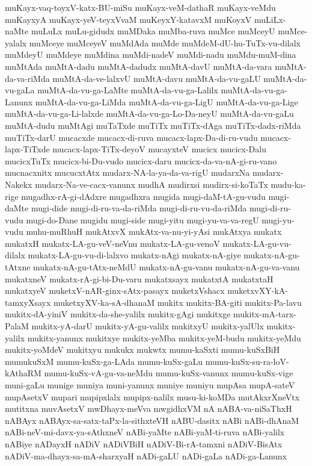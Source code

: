 {muKayx-vaq-toyxV-katx-BU-miSu
muKayx-veM-dathaR
muKayx-veMdu
muKayxyA
muKayx-yeV-teyxVvaM
muKeyxY-katavxM
muKoyxV
muLiLx-naMte
muLuLx
muLu-gidudx
muMDaka
muMba-ruva
muMce
muMceyU
muMce-yalalx
muMceye
muMceyeV
muMdAda
muMde
muMdeM-dU-hu-TuTx-vu-dilalx
muMdeyU
muMdeye
muMdina
muMdi-nadeV
muMdi-nadu
muMdu-muM-dina
muMtAda
muMtA-dadu
muMtA-dadudx
muMtA-davU
muMtA-da-vara
muMtA-da-va-riMda
muMtA-da-ve-lalxvU
muMtA-davu
muMtA-da-vu-gaLU
muMtA-da-vu-gaLa
muMtA-da-vu-ga-LaMte
muMtA-da-vu-ga-Lalilx
muMtA-da-vu-ga-Lanunx
muMtA-da-vu-ga-LiMda
muMtA-da-vu-ga-LigU
muMtA-da-vu-ga-Lige
muMtA-da-vu-ga-Li-lalxde
muMtA-da-vu-ga-Lo-Da-neyU
muMtA-da-vu-gaLu
muMtA-dudu
muMtAgi
muTaTxde
muTiTx
muTiTx-dAga
muTiTx-dadx-riMda
muTiTx-darU
mucacxde
mucacx-di-ruva
mucacx-lapx-Da-di-ru-vudu
mucacx-lapx-TiTxde
mucacx-lapx-TiTx-deyoV
mucayxteV
mucicx
mucicx-Dalu
mucicxTuTx
mucicx-bi-Du-vudo
mucicx-daru
mucicx-da-va-nA-gi-ru-vano
mucnacxnitx
mucucxtAtx
mudarx-NA-la-ya-da-va-rigU
mudarxNa
mudarx-Nakekx
mudarx-Na-ve-cacx-vanunx
mudhA
mudirxsi
mudirx-si-koTaTx
mudu-ka-rige
mugadhx-rA-gi-dAdxre
mugadhxra
mugida
mugi-daM-tA-gu-vudu
mugi-daMte
mugi-dide
mugi-di-ru-va-da-riMda
mugi-di-ru-vu-da-riMda
mugi-di-ru-vudu
mugi-do-Dane
mugidu
mugi-side
mugi-yitu
mugi-yu-va-va-regU
mugi-yu-vudu
muhu-muRhuH
mukAtxvX
mukAtx-va-nu-yi-yAsi
mukAtxya
mukatx
mukatxH
mukatx-LA-gu-veV-neVnu
mukatx-LA-gu-venoV
mukatx-LA-gu-vu-dilalx
mukatx-LA-gu-vu-di-lalxvo
mukatx-nAgi
mukatx-nA-giye
mukatx-nA-gu-tAtxne
mukatx-nA-gu-tAtx-neMdU
mukatx-nA-gu-vanu
mukatx-nA-gu-va-vanu
mukatxneV
mukatx-rA-gi-bi-Du-varu
mukatxsayx
mukatxtA
mukatxtaH
mukatxyeV
muketxV-nAR-ginx-sAtx-pasayx
muketxVshacx
muketxvXY-kA-tamxyXsayx
muketxyXV-ka-sA-dhanaM
mukitx
mukitx-BA-giti
mukitx-Pa-lavu
mukitx-dA-yiniV
mukitx-da-she-yalilx
mukitx-gAgi
mukitxge
mukitx-mA-tarx-PalaM
mukitx-yA-darU
mukitx-yA-gu-valilx
mukitxyU
mukitx-yalUlx
mukitx-yalilx
mukitx-yanunx
mukitxye
mukitx-yeMba
mukitx-yeM-budu
mukitx-yeMdu
mukitx-yoMdeV
mukitxyu
mukukx
mukwtx
mumu-kaSxti
mumu-kuSxBiH
mumukuSxM
mumu-kuSx-ga-LAda
mumu-kuSx-gaLu
mumu-kuSx-su-ra-loV-kAthaRM
mumu-kuSx-vA-gu-va-neMdu
mumu-kuSx-vanunx
mumu-kuSx-vige
muni-gaLu
munige
muniya
muni-yanunx
muniye
muniyu
mupAsa
mupA-sateV
mupAsetxV
mupari
mupipxlalx
mupipx-nalilx
musu-ki-koMDa
mutAkxrXneVtx
mutitxna
muvAsetxV
mwDhayx-meVva
mwgidhxVM
nA
nABA-va-niSaThxH
nABAyx
nABAyx-sa-satx-taPx-la-sithxteVH
nABU-dasitx
nABi
nABi-dhAnaM
nABi-neV-mi-davx-ya-sAthxneV
nABi-yaMte
nABi-yaM-ti-ruva
nABi-yalilx
nABiye
nADayxH
nADiV
nADiVBiH
nADiV-Bi-rA-tamxni
nADiV-BisAtx
nADiV-ma-dhayx-sa-mA-sharxyaH
nADi-gaLU
nADi-gaLa
nADi-ga-Lanunx
}
